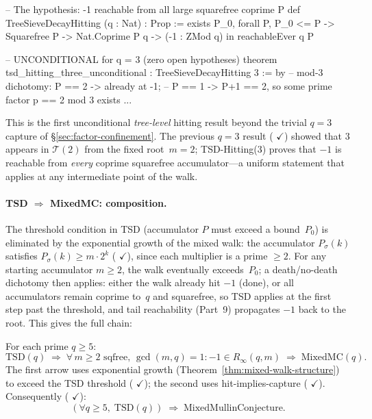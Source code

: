 \begin{leancode}
-- The hypothesis: -1 reachable from all large squarefree coprime P
def TreeSieveDecayHitting (q : Nat) : Prop :=
  exists P_0, forall P, P_0 <= P -> Squarefree P -> Nat.Coprime P q ->
    (-1 : ZMod q) in reachableEver q P

-- UNCONDITIONAL for q = 3 (zero open hypotheses)
theorem tsd_hitting_three_unconditional : TreeSieveDecayHitting 3 := by
  -- mod-3 dichotomy: P == 2 -> already at -1;
  -- P == 1 -> P+1 == 2, so some prime factor p == 2 mod 3 exists
  ...
\end{leancode}

\noindent
This is the first unconditional \emph{tree-level} hitting result beyond the
trivial $q = 3$ capture of \S\ref{sec:factor-confinement}.
The previous $q{=}3$ result
(
{\color{leanink}$\checkmark$})
showed that $3$ appears in $\mathcal{T}(2)$ from the fixed root~$m{=}2$;
TSD-Hitting(3) proves that $-1$ is reachable from \emph{every}
coprime squarefree accumulator---a uniform statement that applies at
any intermediate point of the walk.

\paragraph{TSD $\Rightarrow$ MixedMC: composition.}
The threshold condition in TSD (accumulator $P$ must exceed
a bound~$P_0$) is eliminated by the exponential growth of the mixed
walk: the accumulator $P_\sigma(k)$ satisfies
$P_\sigma(k) \geq m \cdot 2^k$
(
{\color{leanink}$\checkmark$}),
since each multiplier is a prime $\geq 2$.  For any starting
accumulator $m \geq 2$, the walk eventually exceeds~$P_0$; a
death/no-death dichotomy then applies: either the walk already hit
$-1$ (done), or all accumulators remain coprime to~$q$ and
squarefree, so TSD applies at the first step past the threshold, and
tail reachability (Part~9) propagates $-1$ back to the root.  This
gives the full chain:

\begin{theorem}
\label{thm:tsd-chain}
For each prime $q \geq 5$:
\[
  \mathrm{TSD}(q)
  \;\Longrightarrow\;
  \forall\, m \geq 2 \text{ sqfree, } \gcd(m,q)=1 \colon
  {-}1 \in R_\infty(q, m)
  \;\Longrightarrow\;
  \mathrm{MixedMC}(q).
\]
The first arrow uses exponential growth
(Theorem~\textup{\ref{thm:mixed-walk-structure}})
to exceed the TSD threshold
(
{\color{leanink}$\checkmark$});
the second uses hit-implies-capture
(
{\color{leanink}$\checkmark$}).
Consequently
(
{\color{leanink}$\checkmark$}):
\[
  (\forall q \geq 5,\; \mathrm{TSD}(q))
  \;\Longrightarrow\; \mathrm{MixedMullinConjecture}.
\]
\end{theorem}

